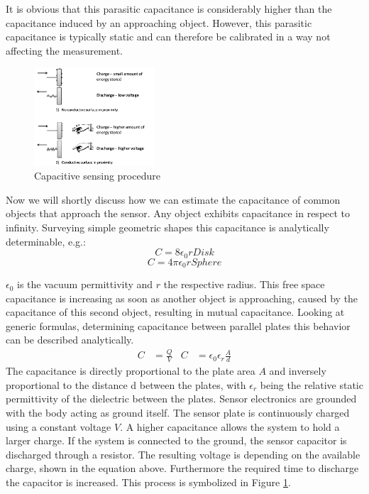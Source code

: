 It is obvious that this parasitic capacitance is considerably higher than the capacitance induced by an approaching object. However, this parasitic capacitance is typically static and can therefore be calibrated in a way not affecting the measurement. 
\begin{figure}[h]
\centering
\includegraphics[width=0.4\textwidth]{images/cap_procedure.png}
\caption{Capacitive sensing procedure}
\label{fig:cap_procedure}
\end{figure} 
Now we will shortly discuss how we can estimate the capacitance of common objects that approach the sensor. Any object exhibits capacitance in respect to infinity. Surveying simple geometric shapes this capacitance is analytically determinable, e.g.:
\begin{equation}
C=8\epsilon_{0}r Disk
\end{equation}
\begin{equation}
C=4\pi\epsilon_{0}r	Sphere
\end{equation}

\(\epsilon_{0}\) is the vacuum permittivity and \(r\) the respective radius. This free space capacitance is increasing as soon as another object is approaching, caused by the capacitance of this second object, resulting in mutual capacitance. Looking at generic formulas, determining capacitance between parallel plates this behavior can be described analytically.
\begin{align}
C&=\frac{Q}{V} & C&=\epsilon_{0}\epsilon_{r}\frac{A}{d}
\end{align}
The capacitance is directly proportional to the plate area \(A\) and inversely proportional to the distance d between the plates, with \(\epsilon_{r}\) being the relative static permittivity of the dielectric between the plates. Sensor electronics are grounded with the body acting as ground itself. The sensor plate is continuously charged using a constant voltage \(V\). A higher capacitance allows the system to hold a larger charge. If the system is connected to the ground, the sensor capacitor is discharged through a resistor. The resulting voltage is depending on the available charge, shown in the equation above. Furthermore the required time to discharge the capacitor is increased. This process is symbolized in Figure \ref{fig:cap_procedure}.

